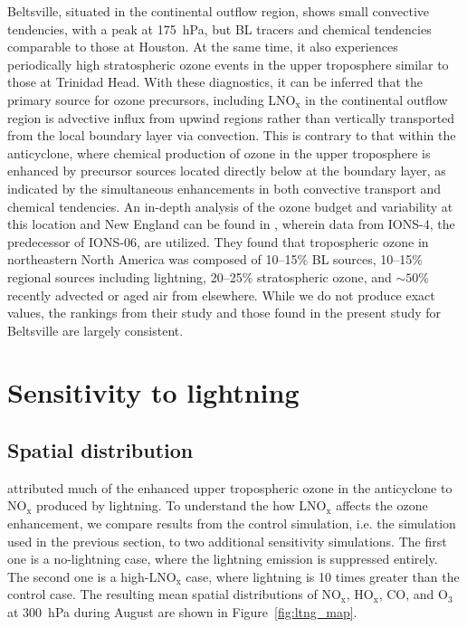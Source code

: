 Beltsville, situated in the continental outflow region, shows small convective
tendencies, with a peak at 175~hPa, but BL tracers and chemical tendencies comparable to those at Houston.
At the same time, it also experiences periodically high stratospheric ozone events
in the upper troposphere similar to those at Trinidad Head. With these diagnostics,
it can be inferred that the primary source for ozone precursors, including
LNO$_{\mathrm{x}}$ in the continental outflow region is advective influx from
upwind regions rather than vertically transported from the local boundary layer
via convection. This is contrary to that within the anticyclone, where chemical
production of ozone in the upper troposphere is enhanced by precursor sources
located directly below at the boundary layer, as indicated by the simultaneous
enhancements in both convective transport and chemical tendencies. An in-depth analysis of the ozone
budget and variability at this location and New England can be found in
\citet{Thompson:2007gd,Thompson:2007ov}, wherein data from IONS-4, the
predecessor of IONS-06, are utilized. They found that tropospheric ozone in
northeastern North America was composed of 10--15\% BL sources, 10--15\%
regional sources including lightning, 20--25\% stratospheric ozone, and
$\sim50\%$ recently advected or aged air from elsewhere. While we
do not produce exact values, the rankings from their study and those found in
the present study for Beltsville are largely consistent.

\section{Sensitivity to lightning}\label{sect:sensitivity}

\subsection{Spatial distribution}

\citet{Cooper:2007cr} attributed much of the enhanced upper tropospheric ozone in the
anticyclone to $\mathrm{NO_x}$ produced by lightning. To understand the how LNO$_{\mathrm{x}}$
affects the ozone enhancement, we compare results from the control simulation, i.e.
the simulation used in the previous section, to two additional sensitivity simulations.
The first one is a no-lightning case, where the lightning emission is suppressed entirely.
The second one is a high-$\mathrm{LNO_x}$ case, where lightning is 10 times greater
than the control case. The resulting mean spatial
distributions of NO$_{\mathrm{x}}$, HO$_{\mathrm{x}}$, CO, and O$_3$ at 300~hPa
during August are shown in Figure~\ref{fig:ltng_map}.

